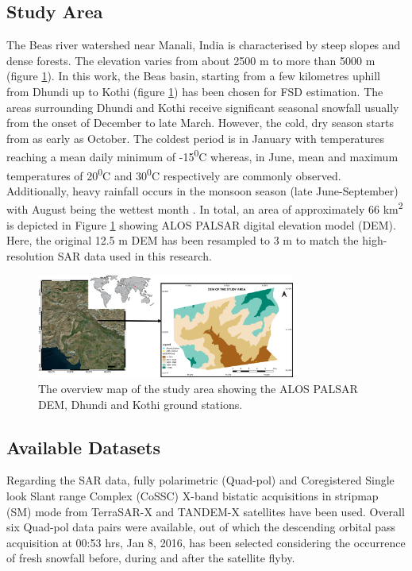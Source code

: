 \documentclass{article}
\begin{document}
\subsection{Study Area}
\label{ssec:area}
The Beas river watershed near Manali, India is characterised by steep slopes and dense forests. The elevation varies from about 2500 m to more than 5000 m (figure \ref{fig:overview}). In this work, the Beas basin, starting from a few kilometres uphill from Dhundi up to Kothi (figure \ref{fig:overview}) has been chosen for FSD estimation. The areas surrounding Dhundi and Kothi receive significant seasonal snowfall usually from the onset of December to late March. However, the cold, dry season starts from as early as October. The coldest period is in January with temperatures reaching a mean daily minimum of -15\textsuperscript{0}C whereas, in June, mean and maximum temperatures of 20\textsuperscript{0}C and 30\textsuperscript{0}C respectively are commonly observed. Additionally, heavy rainfall occurs in the monsoon season (late June-September) with August being the wettest month \cite{Thakur2012}. In total, an area of approximately 66 km\textsuperscript{2} is depicted in Figure \ref{fig:overview} showing ALOS PALSAR digital elevation model (DEM). Here, the original 12.5 m DEM has been resampled to 3 m to match the high-resolution SAR data used in this research. 

\begin{figure}[htb]
\centering
\includegraphics[width=8.5cm]{Overview.png}
\vspace{-2ex}
\caption{The overview map of the study area showing the ALOS PALSAR DEM, Dhundi and Kothi ground stations.}
\label{fig:overview}
\end{figure}

\subsection{Available Datasets}
\label{ssec:data}
Regarding the SAR data, fully polarimetric (Quad-pol) and Coregistered Single look Slant range Complex (CoSSC) X-band bistatic acquisitions in stripmap (SM) mode from TerraSAR-X and TANDEM-X satellites have been used. Overall six Quad-pol data pairs were available, out of which the descending orbital pass acquisition at 00:53 hrs, Jan 8, 2016, has been selected considering the occurrence of fresh snowfall before, during and after the satellite flyby.
\end{document}
